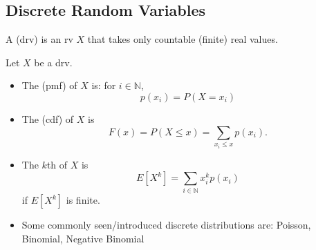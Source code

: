 \documentclass[notoc,notitlepage]{tufte-book}
\begin{document}
\subsection{Discrete Random Variables}%
\label{sub:discrete_random_variables}

\begin{defn}
\label{defn:discrete_random_variable}
  A  (drv) is an rv $X$ that takes only countable (finite) real values.
\end{defn}

\begin{note}
  Let $X$ be a drv.
  \begin{itemize}
    \item The  (pmf) of $X$ is: for $i \in \mathbb{N}$,
      \begin{equation*}
        p(x_i) = P(X = x_i)
      \end{equation*}

    \item The  (cdf) of $X$ is
      \begin{equation*}
        F(x) = P(X \leq x) = \sum_{x_i \leq x} p(x_i).
      \end{equation*}

    \item The $k$th  of $X$ is
      \begin{equation*}
        E[X^k] = \sum_{i \in \mathbb{N}} x_i^k p(x_i)
      \end{equation*}
      if $E[X^k]$ is finite.

    \item Some commonly seen/introduced discrete distributions are: Poisson, Binomial, Negative Binomial
  \end{itemize}
\end{note}
\end{document}
